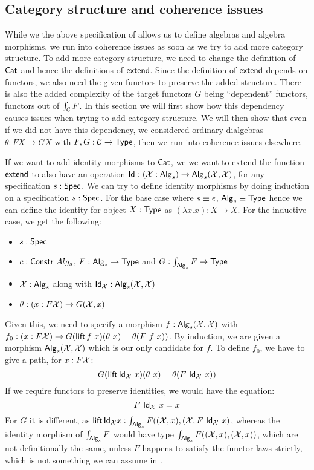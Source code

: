\documentclass[a4paper,10pt]{article}
\begin{document}
\subsection{Category structure and coherence issues}
\label{sec:hitscategory}

While we the above specification of \hits allows us to define algebras
and algebra morphisms, we run into coherence issues as soon as we try
to add more category structure. To add more category structure, we
need to change the definition of $\mathsf{Cat}$ and hence the definitions of
$\mathsf{extend}$. Since the definition of $\mathsf{extend}$ depends on functors, we
also need the given functors to preserve the added structure. There is
also the added complexity of the target functors $G$ being
``dependent'' functors, \ie functors out of $\int_{\mathcal{C}} F$. In this
section we will first show how this dependency causes issues when
trying to add category structure. We will then show that even if we
did not have this dependency, \ie we considered ordinary dialgebras
$\theta : F X \to G X$ with $F, G : \mathcal{C} \to \mathsf{Type}$, then we run into
coherence issues elsewhere.

If we want to add identity morphisms to $\mathsf{Cat}$, we we want to extend
the function $\mathsf{extend}$ to also have an operation
$\mathsf{Id}_{} : (\mathcal{X} : \mathsf{Alg}_s) \to \mathsf{Alg}_s(\mathcal{X},\mathcal{X})$, for any
specification $s : \mathsf{Spec}$. We can try to define identity morphisms by
doing induction on a specification $s : \mathsf{Spec}$. For the base case
where $s \equiv \epsilon$, $\mathsf{Alg}_s \equiv \mathsf{Type}$ hence we can define
the identity for object $X : \mathsf{Type}$ as $(\lambda x . x) : X \to X$. For
the inductive case, we get the following:
%
\begin{itemize}
\item $s : \mathsf{Spec}$ 
\item $c : \mathsf{Constr}\ Alg_s$, \ie $F : \mathsf{Alg}_s \to \mathsf{Type}$ and $G : \int_{\mathsf{Alg}_s} F \to \mathsf{Type}$
\item $\mathcal{X} : \mathsf{Alg}_s$ along with
  $\mathsf{Id}_{\mathcal{X}} : \mathsf{Alg}_s (\mathcal{X},\mathcal{X})$
\item  $\theta : (x : F \mathcal{X}) \to G (\mathcal{X}, x)$
\end{itemize}
%
Given this, we need to specify a morphism
$f : \mathsf{Alg}_s (\mathcal{X},\mathcal{X})$ with
$f_0 : (x : F \alg{X}) \to G (\lift f\ x) (\theta\ x) = \theta (F\ f\
x))$.
By induction, we are given a morphism $\mathsf{Alg}_s (\mathcal{X},\mathcal{X})$ which
is our only candidate for $f$. To define $f_0$, we have to give a path, for $x : F \mathcal{X}$:
$$
G (\operatorname{\mathsf{lift}} \mathsf{Id}_{\mathcal{X}}\ x) (\theta\ x) = \theta (F\ \mathsf{Id}_{\mathcal{X}}\ x))
$$
If we require functors to preserve identities, we would have the equation:
$$
F\ \mathsf{Id}_{\mathcal{X}}\ x = x
$$
For $G$ it is different, as
$\operatorname{\mathsf{lift}} \mathsf{Id}_{\mathcal{X}} x : \int_{\mathsf{Alg}_s} F ((\mathcal{X},x), (\mathcal{X}, F\
\mathsf{Id}_{\mathcal{X}}\ x)$,
whereas the identity morphism of $\int_{\mathsf{Alg}_s} F$ would have type
$\int_{\mathsf{Alg}_s} F ((\mathcal{X},x),(\mathcal{X},x))$, which are not
definitionally the same, unless $F$ happens to satisfy the functor
laws strictly, which is not something we can assume in \mltt.
\end{document}
